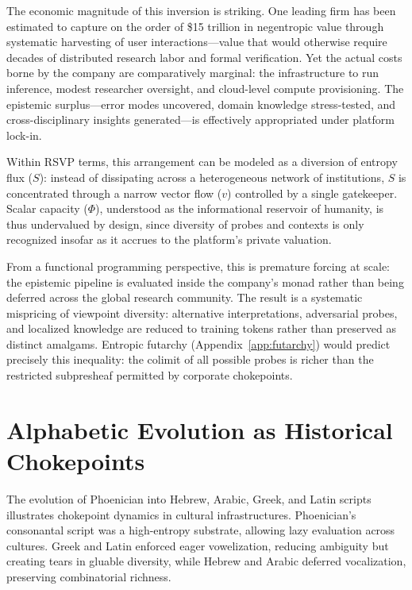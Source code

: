 \documentclass[12pt]{article}
\theoremstyle{remark}
\begin{document}
The economic magnitude of this inversion is striking. One leading firm has been estimated to capture on the order of 
\$15 trillion in negentropic value through systematic harvesting of user interactions---value that would otherwise require 
decades of distributed research labor and formal verification. 
Yet the actual costs borne by the company are comparatively marginal: the infrastructure to run inference, modest researcher oversight, 
and cloud-level compute provisioning. The epistemic surplus---error modes uncovered, domain knowledge stress-tested, 
and cross-disciplinary insights generated---is effectively appropriated under platform lock-in.

Within RSVP terms, this arrangement can be modeled as a diversion of entropy flux ($S$): instead of dissipating across 
a heterogeneous network of institutions, $S$ is concentrated through a narrow vector flow ($v$) controlled by a single gatekeeper. 
Scalar capacity ($\Phi$), understood as the informational reservoir of humanity, is thus undervalued by design, 
since diversity of probes and contexts is only recognized insofar as it accrues to the platform’s private valuation. 

From a functional programming perspective, this is premature forcing at scale: the epistemic pipeline is evaluated inside 
the company’s monad rather than being deferred across the global research community. 
The result is a systematic mispricing of viewpoint diversity: alternative interpretations, adversarial probes, and localized knowledge 
are reduced to training tokens rather than preserved as distinct amalgams. 
Entropic futarchy (Appendix~\ref{app:futarchy}) would predict precisely this inequality: the colimit of all possible probes is richer 
than the restricted subpresheaf permitted by corporate chokepoints.

\section{Alphabetic Evolution as Historical Chokepoints}
The evolution of Phoenician into Hebrew, Arabic, Greek, and Latin scripts illustrates chokepoint dynamics in cultural infrastructures. Phoenician’s consonantal script was a high-entropy substrate, allowing lazy evaluation across cultures. Greek and Latin enforced eager vowelization, reducing ambiguity but creating tears in gluable diversity, while Hebrew and Arabic deferred vocalization, preserving combinatorial richness.
\end{document}
